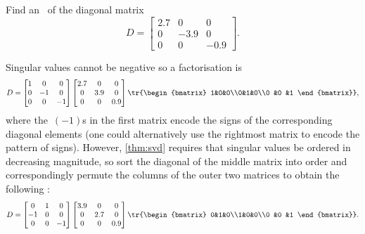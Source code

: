 \begin{example} \label{eg:}
Find an \svd\ of the diagonal matrix
\begin{equation*}
D=\begin{bmatrix} 2.7&0&0\\0&-3.9&0\\0& 0 &-0.9 \end{bmatrix}.
\end{equation*}
\begin{solution} 
Singular values cannot be negative so a factorisation is
\begin{equation*}
D=\begin{bmatrix} 1&0&0\\0&-1&0\\0 &0 &-1 \end{bmatrix}
\begin{bmatrix} 2.7&0&0\\0&3.9&0\\0 &0 &0.9 \end{bmatrix}
\tr{\begin{bmatrix} 1&0&0\\0&1&0\\0 &0 &1 \end{bmatrix}},
\end{equation*}
where the~\((-1)\)s in the first matrix encode the signs of the corresponding diagonal elements (one could alternatively use the rightmost matrix to encode the pattern of signs).
However, \autoref{thm:svd} requires that  singular values be ordered in decreasing magnitude, so sort the diagonal of the middle matrix into order and correspondingly permute the columns of the outer two matrices to obtain the following \svd: 
\begin{equation*}
D=\begin{bmatrix} 0&1&0\\-1&0&0\\0 &0 &-1 \end{bmatrix}
\begin{bmatrix} 3.9&0&0\\0&2.7&0\\0 &0 &0.9 \end{bmatrix}
\tr{\begin{bmatrix} 0&1&0\\1&0&0\\0 &0 &1 \end{bmatrix}}.
\end{equation*} 
\end{solution}
\end{example}



